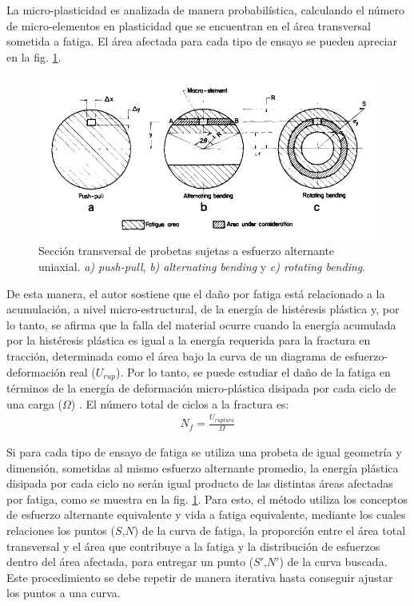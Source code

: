 La micro-plasticidad es analizada de manera probabilística, calculando el número de micro-elementos en plasticidad que se encuentran en el área transversal sometida a fatiga. El área afectada para cada tipo de ensayo se pueden apreciar en la fig. \ref{fig:affar_fat}.

\begin{figure}[h]
\centering
\includegraphics[scale=1]{Imagenes/affectedarea_fatigue.pdf}
\caption{Sección transversal de probetas sujetas a esfuerzo alternante uniaxial. \textit{a) push-pull}, \textit{b) alternating bending} y \textit{c) rotating bending}. \cite{esin1980method}}
\label{fig:affar_fat}
\end{figure}

De esta manera, el autor sostiene que el daño por fatiga está relacionado a la acumulación, a nivel micro-estructural, de la energía de histéresis plástica y, por lo tanto, se afirma que la falla del material ocurre cuando la energía acumulada por la histéresis plástica es igual a la energía requerida para la fractura en tracción, determinada como el área bajo la curva de un diagrama de esfuerzo-deformación real ($U_{rup}$). Por lo tanto, se puede estudiar el daño de la fatiga en términos de la energía de deformación micro-plástica disipada por cada ciclo de una carga ($\Omega$) \cite{esin1967stress}. El número total de ciclos a la fractura es:
\begin{gather}
	N_f = \frac{U_{ruptura}}{\Omega}
\end{gather} 

Si para cada tipo de ensayo de fatiga se utiliza una probeta de igual geometría y dimensión, sometidas al mismo esfuerzo alternante promedio, la energía plástica disipada por cada ciclo no serán igual producto de las distintas áreas afectadas por fatiga, como se muestra en la fig. \ref{fig:affar_fat}. Para esto, el método utiliza los conceptos de esfuerzo alternante equivalente y vida a fatiga equivalente, mediante los cuales relaciones los puntos ($S$,$N$) de la curva de fatiga, la proporción entre el área total transversal y el área que contribuye a la fatiga y la distribución de esfuerzos dentro del área afectada, para entregar un punto ($S'$,$N'$) de la curva buscada. Este procedimiento se debe repetir de manera iterativa hasta conseguir ajustar los puntos a una curva.

